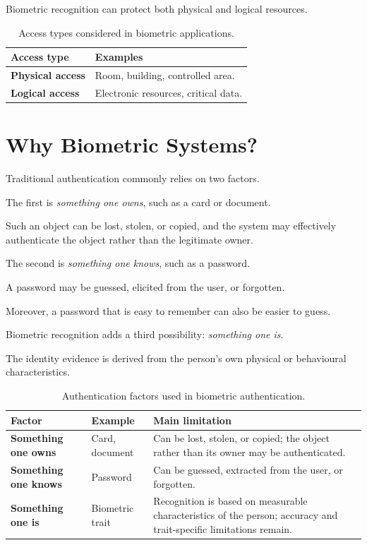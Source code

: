 \documentclass[11pt,a4paper,oneside]{report}
\begin{document}
Biometric recognition can protect both physical and logical resources.

\begin{table}[htbp]
\centering
\caption{Access types considered in biometric applications.}
\label{tab:access-types}
\small

\begin{tabular}{>{\bfseries}P{3.2cm} P{10.1cm}}
\toprule
{}
Access type & \textbf{Examples} \\
\midrule
Physical access & Room, building, controlled area. \\
Logical access & Electronic resources, critical data. \\
\bottomrule
\end{tabular}
\end{table}

\section{Why Biometric Systems?}
\label{subsec:why-biometrics}

Traditional authentication commonly relies on two factors.

The first is \emph{something one owns}, such as a card or document.

Such an object can be lost, stolen, or copied, and the system may
effectively authenticate the object rather than the legitimate owner.

The second is \emph{something one knows}, such as a password.

A password may be guessed, elicited from the user, or forgotten.

Moreover, a password that is easy to remember can also be easier to guess.

Biometric recognition adds a third possibility:
\emph{something one is}.

The identity evidence is derived from the person's own physical or
behavioural characteristics.

\begin{table}[htbp]
\centering
\caption{Authentication factors used in biometric authentication.}
\label{tab:auth-factors}
\small

\begin{tabular}{>{\bfseries}P{3.25cm} P{2.7cm} P{8.1cm}}
\toprule
{}
Factor & \textbf{Example} &
\textbf{Main limitation} \\
\midrule

Something one owns &
Card, document &
Can be lost, stolen, or copied; the object rather than its owner may be
authenticated. \\

Something one knows &
Password &
Can be guessed, extracted from the user, or forgotten. \\

Something one is &
Biometric trait &
Recognition is based on measurable characteristics of the person;
accuracy and trait-specific limitations remain. \\

\bottomrule
\end{tabular}
\end{table}
\end{document}
